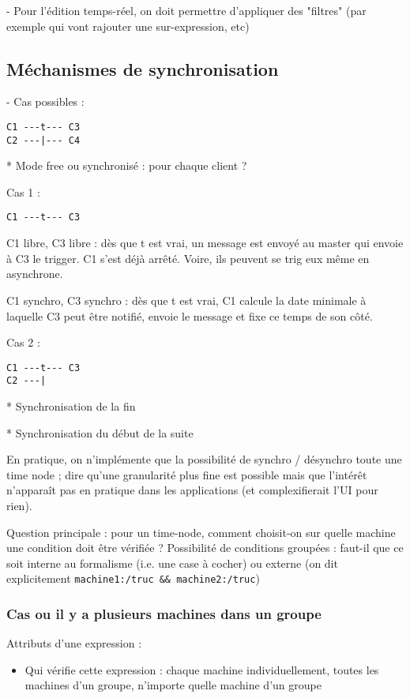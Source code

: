 \documentclass{article}
\begin{document}
- Pour l'édition temps-réel, on doit permettre d'appliquer des "filtres" (par exemple qui vont rajouter une sur-expression, etc)
\subsection{Méchanismes de synchronisation}
- Cas possibles : 

\begin{lstlisting}
C1 ---t--- C3
C2 ---|--- C4
\end{lstlisting}
* Mode free ou synchronisé : pour chaque client ? 

Cas 1 : 
\begin{lstlisting}
C1 ---t--- C3
\end{lstlisting}
C1 libre, C3 libre : dès que t est vrai, un message est envoyé au master qui envoie à C3 le trigger. C1 s'est déjà arrêté.
Voire, ils peuvent se trig eux même en asynchrone.

C1 synchro, C3 synchro : dès que t est vrai, C1 calcule la date minimale à laquelle C3 peut être notifié, envoie le message et fixe ce temps de son côté.

Cas 2 : 
\begin{lstlisting}
C1 ---t--- C3
C2 ---|
\end{lstlisting}

* Synchronisation de la fin

* Synchronisation du début de la suite

En pratique, on n'implémente que la possibilité de synchro / désynchro toute une time node ; dire qu'une granularité plus fine est possible mais que l'intérêt n'apparaît pas en pratique dans les applications (et complexifierait l'UI pour rien).

Question principale : pour un time-node, comment choisit-on sur quelle machine une condition doit être vérifiée ? Possibilité de conditions groupées : faut-il que ce soit interne au formalisme (i.e. une case à cocher) ou externe (on dit explicitement \lstinline|machine1:/truc && machine2:/truc|)

\subsubsection{Cas ou il y a plusieurs machines dans un groupe}
Attributs d'une expression : 
\begin{itemize}
    \item Qui vérifie cette expression : chaque machine individuellement, toutes les machines d'un groupe, n'importe quelle machine d'un groupe 
\end{itemize}
\end{document}
